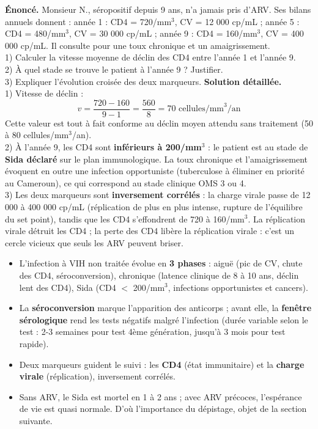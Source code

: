 \documentclass[11pt]{article}
\begin{document}
\begin{exoresolu}
\textbf{Énoncé.} Monsieur N., séropositif depuis 9 ans, n'a jamais pris d'ARV. Ses bilans annuels donnent : année 1 : CD4 = 720/mm$^3$, CV = 12 000 cp/mL ; année 5 : CD4 = 480/mm$^3$, CV = 30 000 cp/mL ; année 9 : CD4 = 160/mm$^3$, CV = 400 000 cp/mL. Il consulte pour une toux chronique et un amaigrissement.\\
1) Calculer la vitesse moyenne de déclin des CD4 entre l'année 1 et l'année 9.\\
2) À quel stade se trouve le patient à l'année 9 ? Justifier.\\
3) Expliquer l'évolution croisée des deux marqueurs.
\tcblower
\textbf{Solution détaillée.}\\
1) Vitesse de déclin :
\[
v = \frac{720 - 160}{9 - 1} = \frac{560}{8} = 70 \text{ cellules/mm}^3\text{/an}
\]
Cette valeur est tout à fait conforme au déclin moyen attendu sans traitement (50 à 80 cellules/mm$^3$/an).\\
2) À l'année 9, les CD4 sont \textbf{inférieurs à 200/mm$^3$} : le patient est au stade de \textbf{Sida déclaré} sur le plan immunologique. La toux chronique et l'amaigrissement évoquent en outre une infection opportuniste (tuberculose à éliminer en priorité au Cameroun), ce qui correspond au stade clinique OMS 3 ou 4.\\
3) Les deux marqueurs sont \textbf{inversement corrélés} : la charge virale passe de 12 000 à 400 000 cp/mL (réplication de plus en plus intense, rupture de l'équilibre du set point), tandis que les CD4 s'effondrent de 720 à 160/mm$^3$. La réplication virale détruit les CD4 ; la perte des CD4 libère la réplication virale : c'est un cercle vicieux que seuls les ARV peuvent briser.
\end{exoresolu}

\begin{aretenir}
\begin{itemize}
\item L'infection à VIH non traitée évolue en \textbf{3 phases} : aiguë (pic de CV, chute des CD4, séroconversion), chronique (latence clinique de 8 à 10 ans, déclin lent des CD4), Sida (CD4 $<$ 200/mm$^3$, infections opportunistes et cancers).
\item La \textbf{séroconversion} marque l'apparition des anticorps ; avant elle, la \textbf{fenêtre sérologique} rend les tests négatifs malgré l'infection (durée variable selon le test : 2-3 semaines pour test 4ème génération, jusqu'à 3 mois pour test rapide).
\item Deux marqueurs guident le suivi : les \textbf{CD4} (état immunitaire) et la \textbf{charge virale} (réplication), inversement corrélés.
\item Sans ARV, le Sida est mortel en 1 à 2 ans ; avec ARV précoces, l'espérance de vie est quasi normale. D'où l'importance du dépistage, objet de la section suivante.
\end{itemize}
\end{aretenir}
\end{document}
